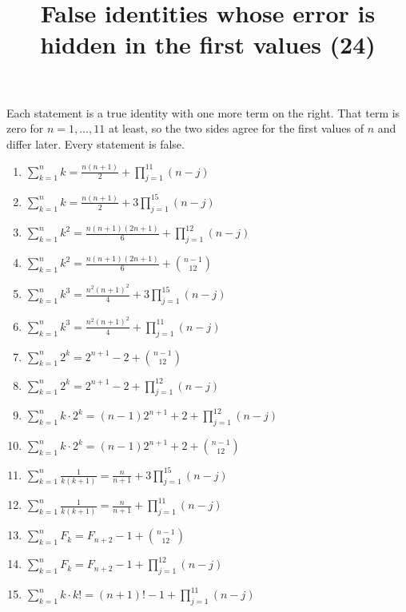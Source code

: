 \documentclass[11pt,a4paper]{article}
\title{False identities whose error is hidden in the first values (24)}
\author{}
\date{}
\begin{document}
\maketitle
Each statement is a true identity with one more term on the right. That term is zero for $n = 1, \ldots, 11$ at least, so the two sides agree for the first values of $n$ and differ later. Every statement is false.

\begin{enumerate}
\item $\displaystyle \sum_{k=1}^{n} k = \frac{n\left(n + 1\right)}{2} + \prod_{j=1}^{11} \left(n - j\right)$
\item $\displaystyle \sum_{k=1}^{n} k = \frac{n\left(n + 1\right)}{2} + 3 \prod_{j=1}^{15} \left(n - j\right)$
\item $\displaystyle \sum_{k=1}^{n} k^{2} = \frac{n\left(n + 1\right)\left(2n + 1\right)}{6} + \prod_{j=1}^{12} \left(n - j\right)$
\item $\displaystyle \sum_{k=1}^{n} k^{2} = \frac{n\left(n + 1\right)\left(2n + 1\right)}{6} + \binom{n - 1}{12}$
\item $\displaystyle \sum_{k=1}^{n} k^{3} = \frac{n^{2}\left(n + 1\right)^{2}}{4} + 3 \prod_{j=1}^{15} \left(n - j\right)$
\item $\displaystyle \sum_{k=1}^{n} k^{3} = \frac{n^{2}\left(n + 1\right)^{2}}{4} + \prod_{j=1}^{11} \left(n - j\right)$
\item $\displaystyle \sum_{k=1}^{n} 2^{k} = 2^{n + 1} - 2 + \binom{n - 1}{12}$
\item $\displaystyle \sum_{k=1}^{n} 2^{k} = 2^{n + 1} - 2 + \prod_{j=1}^{12} \left(n - j\right)$
\item $\displaystyle \sum_{k=1}^{n} k \cdot 2^{k} = \left(n - 1\right) 2^{n + 1} + 2 + \prod_{j=1}^{12} \left(n - j\right)$
\item $\displaystyle \sum_{k=1}^{n} k \cdot 2^{k} = \left(n - 1\right) 2^{n + 1} + 2 + \binom{n - 1}{12}$
\item $\displaystyle \sum_{k=1}^{n} \frac{1}{k\left(k + 1\right)} = \frac{n}{n + 1} + 3 \prod_{j=1}^{15} \left(n - j\right)$
\item $\displaystyle \sum_{k=1}^{n} \frac{1}{k\left(k + 1\right)} = \frac{n}{n + 1} + \prod_{j=1}^{11} \left(n - j\right)$
\item $\displaystyle \sum_{k=1}^{n} F_{k} = F_{n + 2} - 1 + \binom{n - 1}{12}$
\item $\displaystyle \sum_{k=1}^{n} F_{k} = F_{n + 2} - 1 + \prod_{j=1}^{12} \left(n - j\right)$
\item $\displaystyle \sum_{k=1}^{n} k \cdot k! = \left(n + 1\right)! - 1 + \prod_{j=1}^{11} \left(n - j\right)$

\end{enumerate}
\end{document}

